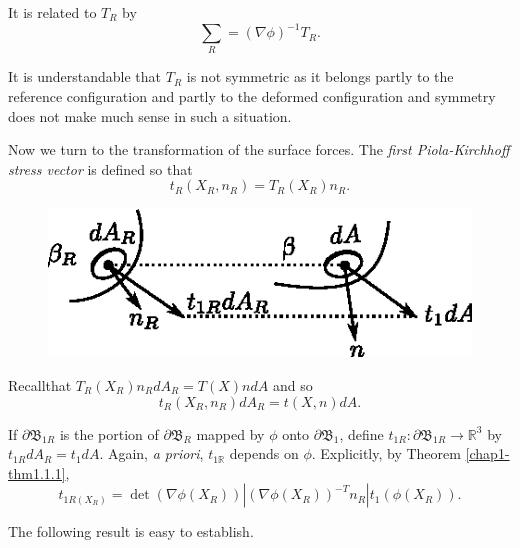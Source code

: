 It is related to $T_R$ by 
\begin{equation*}
\sum_R = (\nabla  \phi)^{-1} T_R.\tag{1.2-19}\label{eq1.2-19}
\end{equation*}

\begin{remark}\label{chap1-rem1.2.4}%
It is understandable that $T_R$ is not symmetric as it belongs partly
to the reference configuration and partly to the deformed
configuration and symmetry does not make much sense in such a
situation. 
\end{remark}

Now we turn to the transformation of the surface forces. The
\textit{first Piola-Kirchhoff stress vector} is defined so that 
\begin{equation*}
t_R(X_R, n_R) = T_R(X_R) n_R.\tag{1.2-20}\label{eq1.2-20}
\end{equation*}
\begin{figure}[H]
\centering
\includegraphics{vol71-figures/fig1.2-5.eps}
\medskip
\caption{}\label{fig1.2.5}
\end{figure}

Recall\pageoriginale  that $T_R (X_R) n_R dA_R = T(X) ndA$ and so 
$$
t_R(X_R,n_R) dA_R = t(X,n)dA.
$$

If $\partial \mathfrak{B}_{1R}$ is the portion of
$\partial\mathfrak{B}_R$ mapped by $\phi$ onto
$\partial\mathfrak{B}_1$, define $t_{1R} : \partial\mathfrak{B}_{1R}
\rightarrow \mathbb{R}^3$ by $t_{1R} dA_R = t_1 dA$. Again, \textit{a
  priori}, $t_{1\mathbb{R}}$ depends on $\phi$. Explicitly, by Theorem
\ref{chap1-thm1.1.1}, 
\begin{equation*}
  t_{1R(X_R)} = \det  (\nabla  \phi (X_R)) | (\nabla  \phi
  (X_R))^{-T} n_R | t_1 (\phi (X_R)).\tag{1.2-21}\label{eq1.2-21} 
\end{equation*}

The following result is easy to establish.

